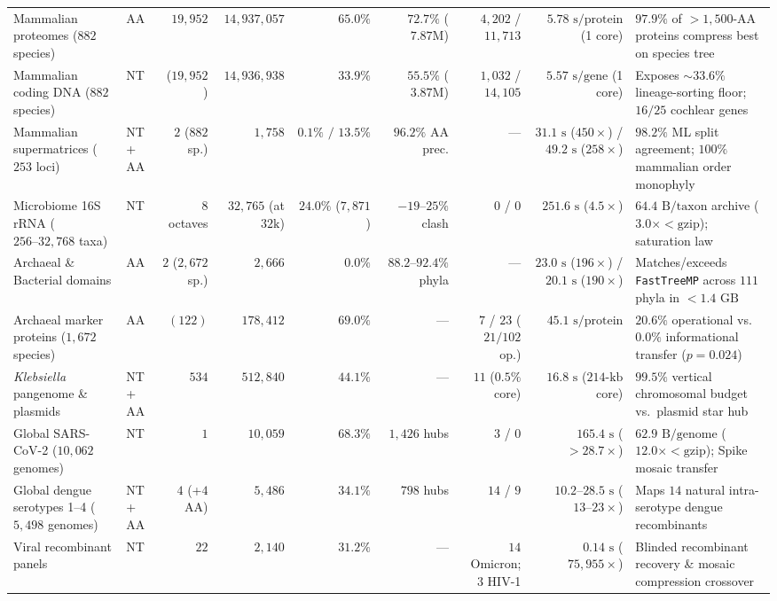 \documentclass[11pt,a4paper]{article}
\begin{document}
\begin{table}[t!]
{\begin{tabular}{@{}llrrrrrrl@{}}
Mammalian proteomes ($882$ species) \citep{malovichko2026toga2} & AA & $19,952$ & $14,937,057$ & $65.0\%$ & $72.7\%$ ($7.87\text{M}$) & $4,202$ / $11,713$ & $5.78\text{ s/protein}$ (1 core) & $97.9\%$ of $>1{,}500\text{-AA}$ proteins compress best on species tree \\
\quad Mammalian coding DNA ($882$ species) & NT & ($19,952$) & $14,936,938$ & $33.9\%$ & $55.5\%$ ($3.87\text{M}$) & $1,032$ / $14,105$ & $5.57\text{ s/gene}$ (1 core) & Exposes $\sim 33.6\%$ lineage-sorting floor; $16/25$ cochlear genes \\
Mammalian supermatrices ($253$ loci) \citep{malovichko2026toga2} & NT + AA & $2$ ($882$ sp.) & $1,758$ & $0.1\%\text{ / }13.5\%$ & $96.2\%$ AA prec. & --- & $31.1\text{ s}$ ($450\times$) / $49.2\text{ s}$ ($258\times$) & $98.2\%$ ML split agreement; $100\%$ mammalian order monophyly \\
Microbiome 16S rRNA ($256\text{--}32{,}768$ taxa) \citep{mcdonald2012greengenes} & NT & $8$ octaves & $32,765$ (at $32\text{k}$) & $24.0\%$ ($7,871$) & $-19\text{--}25\%$ clash & $0$ / $0$ & $251.6\text{ s}$ ($4.5\times$) & $64.4\text{ B/taxon}$ archive ($3.0\times < \text{gzip}$); saturation law \\
Archaeal \& Bacterial domains \citep{parks2020gtdb} & AA & $2$ ($2,672$ sp.) & $2,666$ & $0.0\%$ & $88.2\text{--}92.4\%$ phyla & --- & $23.0\text{ s}$ ($196\times$) / $20.1\text{ s}$ ($190\times$) & Matches/exceeds \texttt{FastTreeMP} across $111$ phyla in $<1.4\text{ GB}$ \\
Archaeal marker proteins ($1,672$ species) \citep{parks2020gtdb} & AA & $(122)$ & $178,412$ & $69.0\%$ & --- & $7$ / $23$ ($21/102$ op.) & $45.1\text{ s/protein}$ & $20.6\%$ operational vs.\ $0.0\%$ informational transfer ($p=0.024$) \\
\textit{Klebsiella} pangenome \& plasmids \citep{wyres2020population} & NT + AA & $534$ & $512,840$ & $44.1\%$ & --- & $11$ ($0.5\%$ core) & $16.8\text{ s}$ ($214\text{-kb}$ core) & $99.5\%$ vertical chromosomal budget vs.\ plasmid star hub \\
Global SARS-CoV-2 ($10,062$ genomes) & NT & $1$ & $10,059$ & $68.3\%$ & $1,426$ hubs & $3$ / $0$ & $165.4\text{ s}$ ($>28.7\times$) & $62.9\text{ B/genome}$ ($12.0\times < \text{gzip}$); Spike mosaic transfer \\
Global dengue serotypes 1--4 ($5,498$ genomes) & NT + AA & $4$ (+$4$ AA) & $5,486$ & $34.1\%$ & $798$ hubs & $14$ / $9$ & $10.2\text{--}28.5\text{ s}$ ($13\text{--}23\times$) & Maps $14$ natural intra-serotype dengue recombinants \\
Viral recombinant panels \citep{carr1998full,kosakovskypond2006gard} & NT & $22$ & $2,140$ & $31.2\%$ & --- & $14$ Omicron; $3$ HIV-1 & $0.14\text{ s}$ ($75{,}955\times$) & Blinded recombinant recovery \& mosaic compression crossover \\
\bottomrule
\end{tabular}%
}
\end{table}
\end{document}
